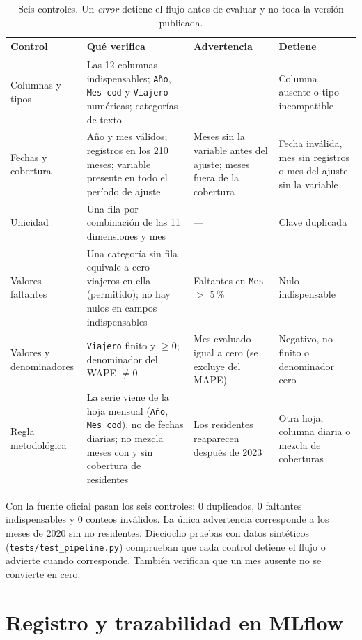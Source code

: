 \documentclass[11pt,letterpaper]{article}
\begin{document}
\begin{table}[H]
\centering\footnotesize
\caption{Seis controles. Un \emph{error} detiene el flujo antes de evaluar y no toca la versión publicada.}
\begin{tabularx}{\textwidth}{@{}p{2.3cm}YYY@{}}
\toprule
Control & Qué verifica & Advertencia & Detiene \\
\midrule
Columnas y tipos & Las 12 columnas indispensables; \texttt{Año}, \texttt{Mes cod} y \texttt{Viajero} numéricas; categorías de texto & --- & Columna ausente o tipo incompatible \\
Fechas y cobertura & Año y mes válidos; registros en los 210 meses; variable presente en todo el período de ajuste & Meses sin la variable antes del ajuste; meses fuera de la cobertura & Fecha inválida, mes sin registros o mes del ajuste sin la variable \\
Unicidad & Una fila por combinación de las 11 dimensiones y mes & --- & Clave duplicada \\
Valores faltantes & Una categoría sin fila equivale a cero viajeros en ella (permitido); no hay nulos en campos indispensables & Faltantes en \texttt{Mes} $>$ 5\,\% & Nulo indispensable \\
Valores y denominadores & \texttt{Viajero} finito y $\ge 0$; denominador del WAPE $\neq 0$ & Mes evaluado igual a cero (se excluye del MAPE) & Negativo, no finito o denominador cero \\
Regla metodológica & La serie viene de la hoja mensual (\texttt{Año}, \texttt{Mes cod}), no de fechas diarias; no mezcla meses con y sin cobertura de residentes & Los residentes reaparecen después de 2023 & Otra hoja, columna diaria o mezcla de coberturas \\
\bottomrule
\end{tabularx}
\end{table}

Con la fuente oficial pasan los seis controles: 0 duplicados, 0 faltantes indispensables y 0 conteos inválidos. La única advertencia corresponde a los meses de 2020 sin no residentes. Dieciocho pruebas con datos sintéticos (\texttt{tests/test\_pipeline.py}) comprueban que cada control detiene el flujo o advierte cuando corresponde. También verifican que un mes ausente no se convierte en cero.

\section{Registro y trazabilidad en MLflow}
\end{document}
